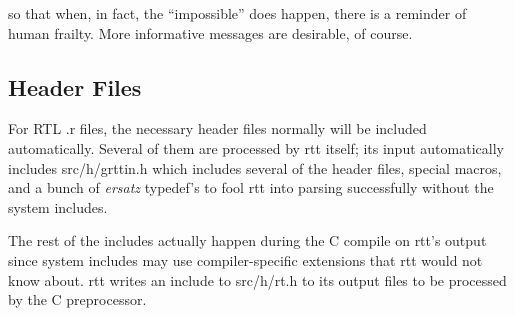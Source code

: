 
\noindent so that when, in fact, the ``impossible'' does happen, there is a
reminder of human frailty.  More informative messages are desirable, of
course.

\subsection{Header Files}

For RTL .r files, the necessary header files normally will be included
automatically.  Several of them are processed by rtt itself; its input
automatically includes src/h/grttin.h which includes several of the
header files, special macros, and a bunch of {\em ersatz\/} typedef's
to fool rtt into parsing successfully without the system includes.

The rest of the includes actually happen during the C compile on rtt's
output since system includes may use compiler-specific extensions that
rtt would not know about.  rtt writes an include to src/h/rt.h to its
output files to be processed by the C preprocessor.

